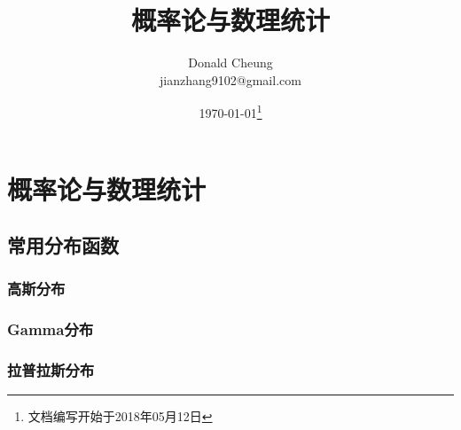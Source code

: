 \ifx\mathnotes\undefined
    \providecommand{\notesroot}{../..}
    \providecommand{\statisticsroot}{.}

    \title{概率论与数理统计}
    \author{Donald Cheung\\jianzhang9102@gmail.com}
    \date{\today\footnote{文档编写开始于2018年05月12日}}

    
\else
    \providecommand{\statisticsroot}{\mathroot/calculus}
\fi

\chapter{概率论与数理统计}

\section{常用分布函数}

\subsection{高斯分布}

\subsection{Gamma分布}

\subsection{拉普拉斯分布}

\ifx\mathnotes\undefined
    
\fi
